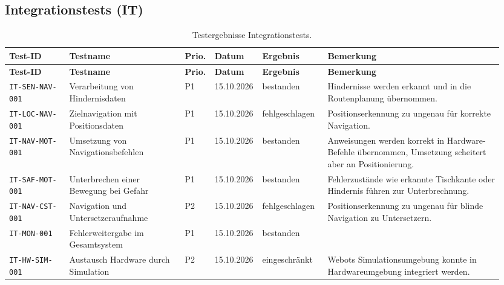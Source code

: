 \documentclass[
  a4paper,
  12pt,
  DIV=12,        %
  parskip=half,  %
  headings=small %
]{scrartcl}
\theoremstyle{definition}
\theoremstyle{definition}
\begin{document}
\begin{landscape}
\subsection{Integrationstests (IT)}\label{it-ergebnisse}
\begin{longtable}[]{@{}
  p{0.12\linewidth}p{0.23\linewidth}p{0.04\linewidth}p{0.08\linewidth}p{0.13\linewidth}p{0.35\linewidth}@{}}
\caption{Testergebnisse Integrationstests.}\\
\toprule
\textbf{Test-ID} & \textbf{Testname} & \textbf{Prio.} & \textbf{Datum} & \textbf{Ergebnis} & \textbf{Bemerkung}\\
\midrule
\endfirsthead
\toprule
\textbf{Test-ID} & \textbf{Testname} & \textbf{Prio.} & \textbf{Datum} & \textbf{Ergebnis} & \textbf{Bemerkung}\\
\midrule
\endhead
\bottomrule
\endfoot
\texttt{IT-SEN-NAV-001} & Verarbeitung von Hindernisdaten & P1 & 15.10.2026 & bestanden & Hindernisse werden erkannt und in die Routenplanung übernommen. \\
\texttt{IT-LOC-NAV-001} & Zielnavigation mit Positionsdaten & P1 & 15.10.2026 & fehlgeschlagen & Positionserkennung zu ungenau für korrekte Navigation. \\
\texttt{IT-NAV-MOT-001} & Umsetzung von Navigationsbefehlen & P1 & 15.10.2026 & bestanden & Anweisungen werden korrekt in Hardware-Befehle übernommen, Umsetzung scheitert aber an Positionierung. \\
\texttt{IT-SAF-MOT-001} & Unterbrechen einer Bewegung bei Gefahr & P1 & 15.10.2026 & bestanden & Fehlerzustände wie erkannte Tischkante oder Hindernis führen zur Unterbrechnung. \\
\texttt{IT-NAV-CST-001} & Navigation und Untersetzeraufnahme & P2 & 15.10.2026 & fehlgeschlagen & Positionserkennung zu ungenau für blinde Navigation zu Untersetzern. \\
\texttt{IT-MON-001} & Fehlerweitergabe im Gesamtsystem & P1 & 15.10.2026 & bestanden &  \\
\texttt{IT-HW-SIM-001} & Austausch Hardware durch Simulation & P2 & 15.10.2026 & eingeschränkt & Webots Simulationsumgebung konnte in Hardwareumgebung integriert werden.  \\
\end{longtable}
\end{landscape}
\end{document}
